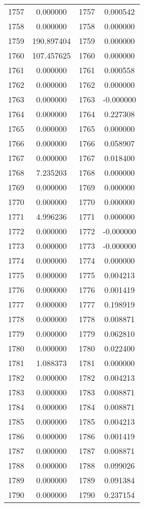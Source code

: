 \documentclass[12pt]{article}
\begin{document}
\begin{longtable}{@{}cccc@{}}
1757 & 0.000000 & 1757 & 0.000542 \\
1758 & 0.000000 & 1758 & 0.000000 \\
1759 & 190.897404 & 1759 & 0.000000 \\
1760 & 107.457625 & 1760 & 0.000000 \\
1761 & 0.000000 & 1761 & 0.000558 \\
1762 & 0.000000 & 1762 & 0.000000 \\
1763 & 0.000000 & 1763 & -0.000000 \\
1764 & 0.000000 & 1764 & 0.227308 \\
1765 & 0.000000 & 1765 & 0.000000 \\
1766 & 0.000000 & 1766 & 0.058907 \\
1767 & 0.000000 & 1767 & 0.018400 \\
1768 & 7.235203 & 1768 & 0.000000 \\
1769 & 0.000000 & 1769 & 0.000000 \\
1770 & 0.000000 & 1770 & 0.000000 \\
1771 & 4.996236 & 1771 & 0.000000 \\
1772 & 0.000000 & 1772 & -0.000000 \\
1773 & 0.000000 & 1773 & -0.000000 \\
1774 & 0.000000 & 1774 & 0.000000 \\
1775 & 0.000000 & 1775 & 0.004213 \\
1776 & 0.000000 & 1776 & 0.001419 \\
1777 & 0.000000 & 1777 & 0.198919 \\
1778 & 0.000000 & 1778 & 0.008871 \\
1779 & 0.000000 & 1779 & 0.062810 \\
1780 & 0.000000 & 1780 & 0.022400 \\
1781 & 1.088373 & 1781 & 0.000000 \\
1782 & 0.000000 & 1782 & 0.004213 \\
1783 & 0.000000 & 1783 & 0.008871 \\
1784 & 0.000000 & 1784 & 0.008871 \\
1785 & 0.000000 & 1785 & 0.004213 \\
1786 & 0.000000 & 1786 & 0.001419 \\
1787 & 0.000000 & 1787 & 0.008871 \\
1788 & 0.000000 & 1788 & 0.099026 \\
1789 & 0.000000 & 1789 & 0.091384 \\
1790 & 0.000000 & 1790 & 0.237154 \\

\end{longtable}
\end{document}
